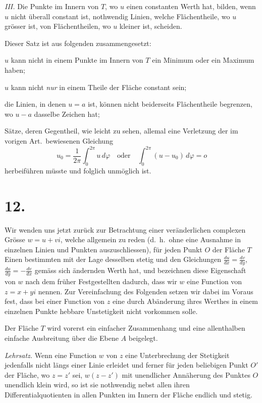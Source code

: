 \documentclass{article}
\begin{document}
\emph{III.} Die Punkte im Innern von $T$, wo $u$ einen constanten Werth hat, bilden, wenn $u$ nicht überall constant ist, nothwendig Linien, welche Flächentheile, wo $u$ grösser ist, von Flächentheilen, wo $u$ kleiner ist, scheiden.

Dieser Satz ist aus folgenden zusammengesetzt:

$u$ kann nicht in einem Punkte im Innern von $T$ ein Minimum oder ein Maximum haben;

$u$ kann nicht \emph{nur} in einem Theile der Fläche constant sein;

die Linien, in denen $u = a$ ist, können nicht beiderseits Flächentheile begrenzen, wo $u - a$ dasselbe Zeichen hat;

Sätze, deren Gegentheil, wie leicht zu sehen, allemal eine Verletzung der im vorigen Art.\ bewiesenen Gleichung
\[
u_0 = \frac{1}{2\pi}\int_0^{2\pi} u\,d\varphi \quad \text{oder} \quad \int_0^{2\pi} (u - u_0)\,d\varphi = o
\]
herbeiführen müsste und folglich unmöglich ist.

\section*{12.}

Wir wenden uns jetzt zurück zur Betrachtung einer veränderlichen complexen Grösse $w = u + vi$, welche allgemein zu reden (d.\ h.\ ohne eine Ausnahme in einzelnen Linien und Punkten auszuschliessen), für jeden Punkt $O$ der Fläche $T$ Einen bestimmten mit der Lage desselben stetig und den Gleichungen $\frac{du}{dx} = \frac{dv}{dy}$, $\frac{du}{dy} = -\frac{dv}{dx}$ gemäss sich ändernden Werth hat, und bezeichnen diese Eigenschaft von $w$ nach dem früher Festgestellten dadurch, dass wir $w$ eine Function von $z = x + yi$ nennen. Zur Vereinfachung des Folgenden setzen wir dabei im Voraus fest, dass bei einer Function von $z$ eine durch Abänderung ihres Werthes in einem einzelnen Punkte hebbare Unstetigkeit nicht vorkommen solle.

Der Fläche $T$ wird vorerst ein einfacher Zusammenhang und eine allenthalben einfache Ausbreitung über die Ebene $A$ beigelegt.

\emph{Lehrsatz.} Wenn eine Function $w$ von $z$ eine Unterbrechung der Stetigkeit jedenfalls nicht längs einer Linie erleidet und ferner für jeden beliebigen Punkt $O'$ der Fläche, wo $z = z'$ sei, $w(z - z')$ mit unendlicher Annäherung des Punktes $O$ unendlich klein wird, so ist sie nothwendig nebst allen ihren Differentialquotienten in allen Punkten im Innern der Fläche endlich und stetig.
\end{document}
